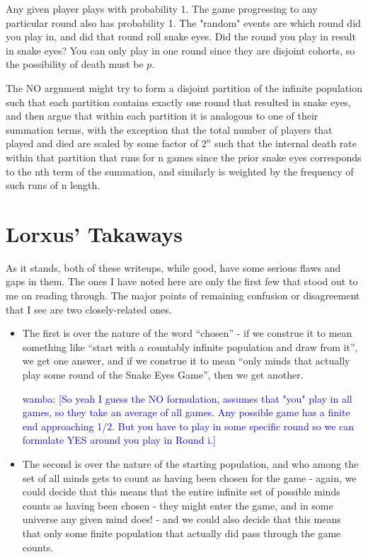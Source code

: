 \documentclass[article,twocolumn]{memoir}
\newcommand{\wamba} [1]{\ifnum\Chatty=1 \textcolor{blue}{wamba:  [#1]} \fi}
\begin{document}
\begin{itemize}
{        Any given player plays with probability 1.  The game progressing to any particular round also has probability 1.  The "random" events are which round did you play in, and did that round roll snake eyes.  Did the round you play in result in snake eyes?  You can only play in one round since they are disjoint cohorts, so the possibility of death must be $p$.

        The NO argument might try to form a disjoint partition of the infinite population such that each partition contains exactly one round that resulted in snake eyes, and then argue that within each partition it is analogous to one of their summation terms, with the exception that the total number of players that played and died are scaled by some factor of $2^n$ such that the internal death rate within that partition that runs for n games since the prior snake eyes corresponds to the nth term of the summation, and similarly is weighted by the frequency of such runs of n length.
    }
\end{itemize}

\chapter*{Lorxus' Takaways}
As it stands, both of these writeups, while good, have some serious flaws and gaps in them. The ones I have noted here are only the first few that stood out to me on reading through. The major points of remaining confusion or disagreement that I see are two closely-related ones. 
\begin{itemize}
    \item The first is over the nature of the word “chosen” - if we construe it to mean something like “start with a countably infinite population and draw from it”, we get one answer, and if we construe it to mean “only minds that actually play some round of the Snake Eyes Game”, then we get another. 

        \wamba{So yeah I guess the NO formulation, assumes that "you" play in all games, so they take an average of all games. Any possible game has a finite end approaching 1/2.  But you have to play in some specific round so we can formulate YES around you play in Round i.}
    \item The second is over the nature of the starting population, and who among the set of all minds gets to count as having been chosen for the game - again, we could decide that this means that the entire infinite set of possible minds counts as having been chosen - they might enter the game, and in some universe any given mind does! - and we could also decide that this means that only some finite population that actually did pass through the game counts.
\end{itemize}
\end{document}
